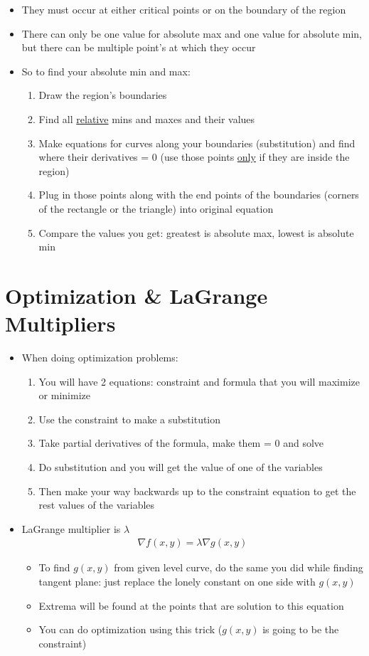 \documentclass{article}
\begin{document}
\begin{itemize}
  \begin{itemize}
    \item They must occur at either critical points or on the boundary of the region
    \item There can only be one value for absolute max and one value for absolute min, but there can be multiple point's at which they occur
    \item So to find your absolute min and max:
    \begin{enumerate}
      \item Draw the region's boundaries
      \item Find all \underline{relative} mins and maxes and their values
      \item Make equations for curves along your boundaries (substitution) and find where their derivatives = 0 (use those points \underline{only} if they are inside the region)
      \item Plug in those points along with the end points of the boundaries (corners of the rectangle or the triangle) into original equation
      \item Compare the values you get: greatest is absolute max, lowest is absolute min
    \end{enumerate}
  \end{itemize}
\end{itemize}


\section{Optimization \& LaGrange Multipliers}
\begin{itemize}
  \item When doing optimization problems:
  \begin{enumerate}
    \item You will have 2 equations: constraint and formula that you will maximize or minimize
    \item Use the constraint to make a substitution
    \item Take partial derivatives of the formula, make them = 0 and solve
    \item Do substitution and you will get the value of one of the variables
    \item Then make your way backwards up to the constraint equation to get the rest values of the variables
  \end{enumerate}
  \item LaGrange multiplier is $\lambda$
  \begin{align}
    \nabla f(x,y) = \lambda\nabla g(x,y)
  \end{align}
  \begin{itemize}
    \item To find $g(x,y)$ from given level curve, do the same you did while finding tangent plane: just replace the lonely constant on one side with $g(x,y)$
    \item Extrema will be found at the points that are solution to this equation
    \item You can do optimization using this trick ($g(x,y)$ is going to be the constraint)
  \end{itemize}
\end{itemize}
\end{document}
